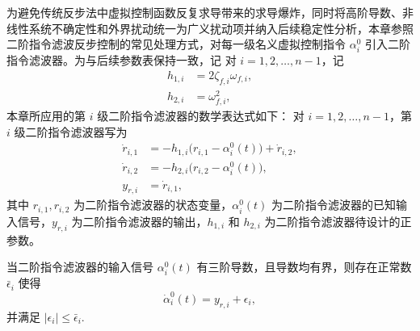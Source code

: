为避免传统反步法中虚拟控制函数反复求导带来的求导爆炸，同时将高阶导数、非线性系统不确定性和外界扰动统一为广义扰动项并纳入后续稳定性分析，本章参照二阶指令滤波反步控制的常见处理方式\cite{ref74}，对每一级名义虚拟控制指令 $\alpha_i^0$ 引入二阶指令滤波器。为与后续参数表保持一致，记
对 $i=1,2,\ldots,n-1$，记
\begin{subequations}
\begin{align}
h_{1,i}&=2\zeta_{f,i}\omega_{f,i},\\
h_{2,i}&=\omega_{f,i}^2,
\end{align}
\end{subequations}
本章所应用的第 $i$ 级二阶指令滤波器的数学表达式如下：
对 $i=1,2,\ldots,n-1$，第 $i$ 级二阶指令滤波器写为
\begin{subequations}\label{eq:ch4_st_observer}
\begin{align}
\dot r_{i,1} &= -h_{1,i}\bigl(r_{i,1}-\alpha_i^0(t)\bigr)+\dot r_{i,2},\\
\dot r_{i,2} &= -h_{2,i}\bigl(r_{i,2}-\alpha_i^0(t)\bigr),\\
y_{r,i} &= \dot r_{i,1},
\end{align}
\end{subequations}
其中 $r_{i,1},r_{i,2}$ 为二阶指令滤波器的状态变量，$\alpha_i^0(t)$ 为二阶指令滤波器的已知输入信号，$y_{r,i}$ 为二阶指令滤波器的输出，$h_{1,i}$ 和 $h_{2,i}$ 为二阶指令滤波器待设计的正参数。

\begin{lemma}\label{lem:ch4_obs1}\hfill\cite{ref6}
当二阶指令滤波器的输入信号 $\alpha_i^0(t)$ 有三阶导数，且导数均有界，则存在正常数 $\bar\epsilon_i$ 使得
\begin{equation}\label{eq:ch3_filter_bound}
\dot\alpha_i^0(t)=y_{r,i}+\epsilon_i,
\end{equation}
并满足 $|\epsilon_i|\le \bar\epsilon_i$.
\end{lemma}


